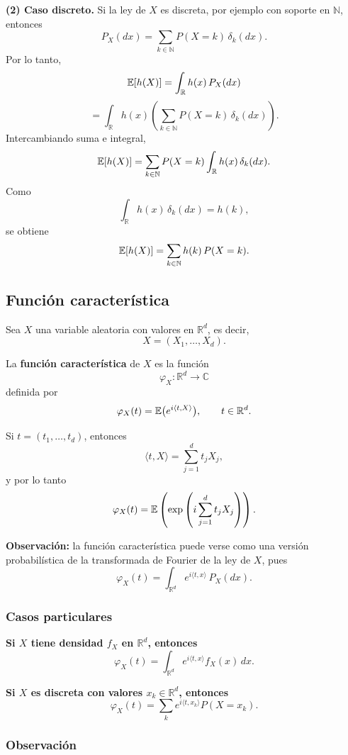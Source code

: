 \medskip

\noindent
\textbf{(2) Caso discreto.}  
Si la ley de $X$ es discreta, por ejemplo con soporte en $\mathbb{N}$, entonces
\[
P_X(dx)=\sum_{k\in\mathbb{N}} P(X=k)\,\delta_k(dx).
\]
Por lo tanto,
\[
\mathbb{E}[h(X)]
=
\int_{\mathbb{R}} h(x)\,P_X(dx)
\]
\[
=
\int_{\mathbb{R}} h(x)\left(\sum_{k\in\mathbb{N}} P(X=k)\,\delta_k(dx)\right).
\]
Intercambiando suma e integral,
\[
\mathbb{E}[h(X)]
=
\sum_{k\in\mathbb{N}} P(X=k)\int_{\mathbb{R}} h(x)\,\delta_k(dx).
\]
Como
\[
\int_{\mathbb{R}} h(x)\,\delta_k(dx)=h(k),
\]
se obtiene
\[
\mathbb{E}[h(X)]
=
\sum_{k\in\mathbb{N}} h(k)\,P(X=k).
\]



\subsection{Función característica}

Sea $X$ una variable aleatoria con valores en $\mathbb{R}^d$, es decir,
\[
X=(X_1,\dots,X_d).
\]

La \textbf{función característica} de $X$ es la función
\[
\varphi_X:\mathbb{R}^d\to\mathbb{C}
\]
definida por
\[
\varphi_X(t)=\mathbb{E}\big(e^{i\langle t,X\rangle}\big),
\qquad t\in\mathbb{R}^d.
\]

Si $t=(t_1,\dots,t_d)$, entonces
\[
\langle t,X\rangle=\sum_{j=1}^d t_jX_j,
\]
y por lo tanto
\[
\varphi_X(t)
=
\mathbb{E}\left(\exp\left(i\sum_{j=1}^d t_jX_j\right)\right).
\]

\medskip

\noindent
\textbf{Observación:} la función característica puede verse como una versión probabilística de la transformada de Fourier de la ley de $X$, pues
\[
\varphi_X(t)=\int_{\mathbb{R}^d} e^{i\langle t,x\rangle}\,P_X(dx).
\]

\subsubsection*{Casos particulares}

\textbf{Si $X$ tiene densidad $f_X$ en $\mathbb{R}^d$, entonces}
\[
\varphi_X(t)
=
\int_{\mathbb{R}^d} e^{i\langle t,x\rangle}f_X(x)\,dx.
\]

\textbf{Si $X$ es discreta con valores $x_k\in\mathbb{R}^d$, entonces}
\[
\varphi_X(t)
=
\sum_k e^{i\langle t,x_k\rangle}P(X=x_k).
\]

\subsubsection*{Observación}

